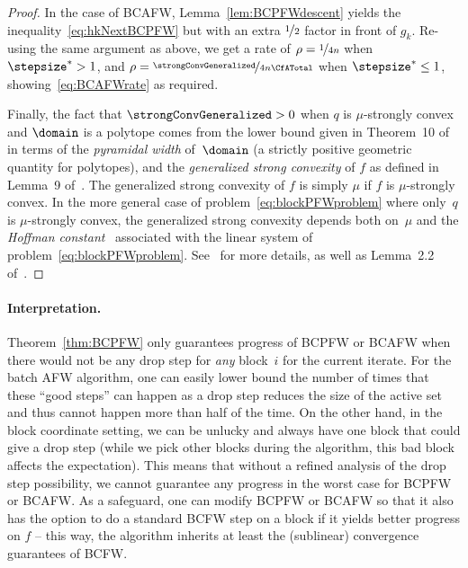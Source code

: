 \documentclass{article}
\begin{document}
\begin{proof}
In the case of BCAFW, Lemma~\ref{lem:BCPFWdescent} yields the inequality~\eqref{eq:hkNextBCPFW} but with an extra $\nicefrac{1}{2}$ factor in front of $g_k$. Re-using the same argument as above, we get a rate of $\rho = \nicefrac{1}{4n}$ when $\stepsize^* > 1$, and $\rho = \nicefrac{\strongConvGeneralized}{4n  \CfATotal}$ when $\stepsize^* \leq 1$, showing~\eqref{eq:BCAFWrate} as required.
%

Finally, the fact that $\strongConvGeneralized > 0$ when $q$ is $\mu$-strongly convex and $\domain$ is a polytope comes from the lower bound given in Theorem~10 of~\citet{LacosteJulien2015linearFW} in terms of the \emph{pyramidal width} of~$\domain$ (a strictly positive geometric quantity for polytopes), and the \emph{generalized strong convexity} of $f$ as defined in Lemma~9 of~\citet{LacosteJulien2015linearFW}. The generalized strong convexity of $f$ is simply $\mu$ if $f$ is $\mu$-strongly convex. In the more general case of problem~\eqref{eq:blockPFWproblem} where only~$q$ is $\mu$-strongly convex, the generalized strong convexity depends both on~$\mu$ and the \emph{Hoffman constant}~ associated with the linear system of problem~\eqref{eq:blockPFWproblem}. See~\citet{LacosteJulien2015linearFW} for more details, as well as Lemma~2.2 of~.
\end{proof}

\paragraph{Interpretation.} Theorem~\ref{thm:BCPFW} only guarantees progress of BCPFW or BCAFW when there would not be any drop step for \emph{any} block~$i$ for the current iterate. For the batch AFW algorithm, one can easily lower bound the number of times that these ``good steps'' can happen as a drop step reduces the size of the active set and thus cannot happen more than half of the time. On the other hand, in the block coordinate setting, we can be unlucky and always have one block that could give a drop step (while we pick other blocks during the algorithm, this bad block affects the expectation). This means that without a refined analysis of the drop step possibility, we cannot guarantee any progress in the worst case for BCPFW or BCAFW. As a safeguard, one can modify BCPFW or BCAFW so that it also has the option to do a standard BCFW step on a block if it yields better progress on $f$ -- this way, the algorithm inherits at least the (sublinear) convergence guarantees of BCFW.
\end{document}
